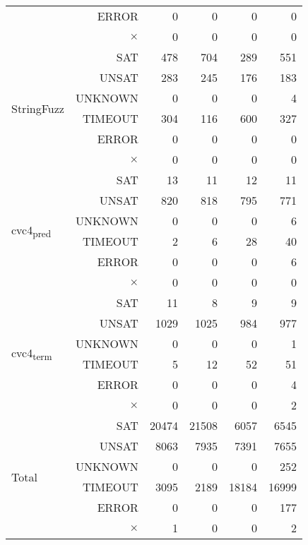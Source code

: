 \documentclass[12pt]{article}
\begin{document}
{\begin{table}[h]
{\begin{tabular}{|l r | r r r r |}
							& ERROR    &     0&     0&     0&     0 \\
							& $\times$ &     0&     0&     0&     0 \\ \hline
\multirow{6}{*}{StringFuzz}	& SAT      &   478&   704&   289&   551 \\
							& UNSAT    &   283&   245&   176&   183 \\
							& UNKNOWN  &     0&     0&     0&     4 \\
							& TIMEOUT  &   304&   116&   600&   327 \\
							& ERROR    &     0&     0&     0&     0 \\
							& $\times$ &     0&     0&     0&     0 \\\hline
\multirow{6}{*}{cvc4\textsubscript{pred}} & SAT &    13&    11&    12&    11 \\
							& UNSAT    &   820&   818&   795&   771 \\
							& UNKNOWN  &     0&     0&     0&     6 \\
							& TIMEOUT  &     2&     6&    28&    40 \\
							& ERROR    &     0&     0&     0&     6 \\
							& $\times$ &     0&     0&     0&     0 \\ \hline
\multirow{6}{*}{cvc4\textsubscript{term}} & SAT &    11&     8&     9&     9 \\
							& UNSAT    &  1029&  1025&   984&   977 \\
							& UNKNOWN  &     0&     0&     0&     1 \\
							& TIMEOUT  &     5&    12&    52&    51 \\
							& ERROR    &     0&     0&     0&     4 \\
							& $\times$ &     0&     0&     0&     2 \\ \hline \hline
\multirow{6}{*}{Total} 		& SAT      & 20474& 21508&  6057&  6545 \\
							& UNSAT    &  8063&  7935&  7391&  7655 \\
							& UNKNOWN  &     0&     0&     0&   252 \\
							& TIMEOUT  &  3095&  2189& 18184& 16999 \\
							& ERROR    &     0&     0&     0&   177 \\
							& $\times$ &     1&     0&     0&     2 \\\hline	
\end{tabular}}
\label{table:base_benchmark}
\end{table}



}
\end{document}
